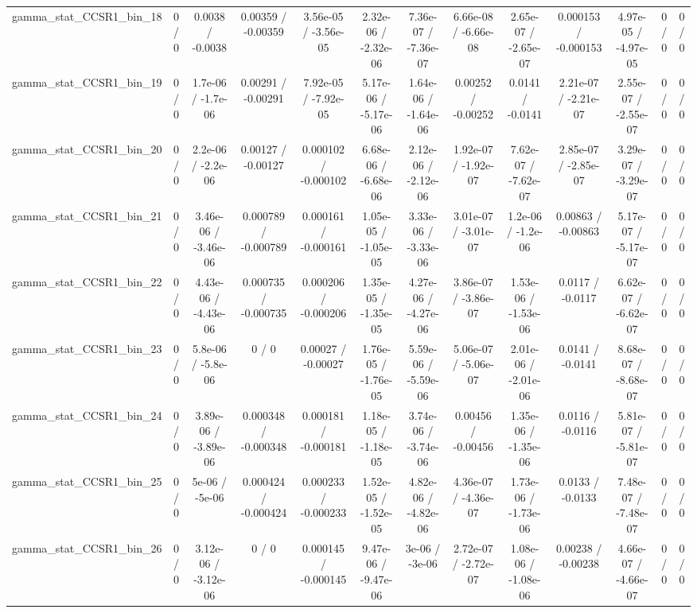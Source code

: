 \documentclass[10pt]{article}
\begin{document}
\begin{table}[htbp]
\begin{center}
\begin{tabular}{|c|c|c|c|c|c|c|c|c|c|c|c|c|}
  gamma_stat_CCSR1_bin_18 & 0 / 0 & 0.0038 / -0.0038 & 0.00359 / -0.00359 & 3.56e-05 / -3.56e-05 & 2.32e-06 / -2.32e-06 & 7.36e-07 / -7.36e-07 & 6.66e-08 / -6.66e-08 & 2.65e-07 / -2.65e-07 & 0.000153 / -0.000153 & 4.97e-05 / -4.97e-05 & 0 / 0 & 0 / 0 \\ 
  gamma_stat_CCSR1_bin_19 & 0 / 0 & 1.7e-06 / -1.7e-06 & 0.00291 / -0.00291 & 7.92e-05 / -7.92e-05 & 5.17e-06 / -5.17e-06 & 1.64e-06 / -1.64e-06 & 0.00252 / -0.00252 & 0.0141 / -0.0141 & 2.21e-07 / -2.21e-07 & 2.55e-07 / -2.55e-07 & 0 / 0 & 0 / 0 \\ 
  gamma_stat_CCSR1_bin_20 & 0 / 0 & 2.2e-06 / -2.2e-06 & 0.00127 / -0.00127 & 0.000102 / -0.000102 & 6.68e-06 / -6.68e-06 & 2.12e-06 / -2.12e-06 & 1.92e-07 / -1.92e-07 & 7.62e-07 / -7.62e-07 & 2.85e-07 / -2.85e-07 & 3.29e-07 / -3.29e-07 & 0 / 0 & 0 / 0 \\ 
  gamma_stat_CCSR1_bin_21 & 0 / 0 & 3.46e-06 / -3.46e-06 & 0.000789 / -0.000789 & 0.000161 / -0.000161 & 1.05e-05 / -1.05e-05 & 3.33e-06 / -3.33e-06 & 3.01e-07 / -3.01e-07 & 1.2e-06 / -1.2e-06 & 0.00863 / -0.00863 & 5.17e-07 / -5.17e-07 & 0 / 0 & 0 / 0 \\ 
  gamma_stat_CCSR1_bin_22 & 0 / 0 & 4.43e-06 / -4.43e-06 & 0.000735 / -0.000735 & 0.000206 / -0.000206 & 1.35e-05 / -1.35e-05 & 4.27e-06 / -4.27e-06 & 3.86e-07 / -3.86e-07 & 1.53e-06 / -1.53e-06 & 0.0117 / -0.0117 & 6.62e-07 / -6.62e-07 & 0 / 0 & 0 / 0 \\ 
  gamma_stat_CCSR1_bin_23 & 0 / 0 & 5.8e-06 / -5.8e-06 & 0 / 0 & 0.00027 / -0.00027 & 1.76e-05 / -1.76e-05 & 5.59e-06 / -5.59e-06 & 5.06e-07 / -5.06e-07 & 2.01e-06 / -2.01e-06 & 0.0141 / -0.0141 & 8.68e-07 / -8.68e-07 & 0 / 0 & 0 / 0 \\ 
  gamma_stat_CCSR1_bin_24 & 0 / 0 & 3.89e-06 / -3.89e-06 & 0.000348 / -0.000348 & 0.000181 / -0.000181 & 1.18e-05 / -1.18e-05 & 3.74e-06 / -3.74e-06 & 0.00456 / -0.00456 & 1.35e-06 / -1.35e-06 & 0.0116 / -0.0116 & 5.81e-07 / -5.81e-07 & 0 / 0 & 0 / 0 \\ 
  gamma_stat_CCSR1_bin_25 & 0 / 0 & 5e-06 / -5e-06 & 0.000424 / -0.000424 & 0.000233 / -0.000233 & 1.52e-05 / -1.52e-05 & 4.82e-06 / -4.82e-06 & 4.36e-07 / -4.36e-07 & 1.73e-06 / -1.73e-06 & 0.0133 / -0.0133 & 7.48e-07 / -7.48e-07 & 0 / 0 & 0 / 0 \\ 
  gamma_stat_CCSR1_bin_26 & 0 / 0 & 3.12e-06 / -3.12e-06 & 0 / 0 & 0.000145 / -0.000145 & 9.47e-06 / -9.47e-06 & 3e-06 / -3e-06 & 2.72e-07 / -2.72e-07 & 1.08e-06 / -1.08e-06 & 0.00238 / -0.00238 & 4.66e-07 / -4.66e-07 & 0 / 0 & 0 / 0 \\ 

\end{tabular}
\end{center}
\end{table}
\end{document}
